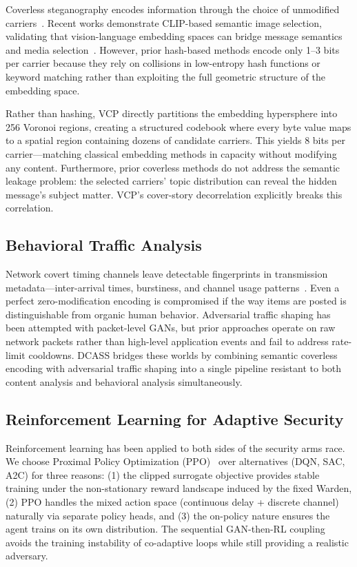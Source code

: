 \documentclass[conference]{IEEEtran}
\begin{document}
Coverless steganography encodes information through the choice of unmodified carriers~\cite{zhou2019coverless}. Recent works demonstrate CLIP-based semantic image selection, validating that vision-language embedding spaces can bridge message semantics and media selection~\cite{radford2021learning}. However, prior hash-based methods encode only 1--3 bits per carrier because they rely on collisions in low-entropy hash functions or keyword matching rather than exploiting the full geometric structure of the embedding space.

Rather than hashing, VCP directly partitions the embedding hypersphere into 256 Voronoi regions, creating a structured codebook where every byte value maps to a spatial region containing dozens of candidate carriers. This yields 8 bits per carrier---matching classical embedding methods in capacity without modifying any content. Furthermore, prior coverless methods do not address the semantic leakage problem: the selected carriers' topic distribution can reveal the hidden message's subject matter. VCP's cover-story decorrelation explicitly breaks this correlation.

\subsection{Behavioral Traffic Analysis}

Network covert timing channels leave detectable fingerprints in transmission metadata---inter-arrival times, burstiness, and channel usage patterns~\cite{cabuk2004ip}. Even a perfect zero-modification encoding is compromised if the way items are posted is distinguishable from organic human behavior. Adversarial traffic shaping has been attempted with packet-level GANs, but prior approaches operate on raw network packets rather than high-level application events and fail to address rate-limit cooldowns. DCASS bridges these worlds by combining semantic coverless encoding with adversarial traffic shaping into a single pipeline resistant to both content analysis and behavioral analysis simultaneously.

\subsection{Reinforcement Learning for Adaptive Security}

Reinforcement learning has been applied to both sides of the security arms race. We choose Proximal Policy Optimization (PPO)~\cite{schulman2017proximal} over alternatives (DQN, SAC, A2C) for three reasons: (1) the clipped surrogate objective provides stable training under the non-stationary reward landscape induced by the fixed Warden, (2) PPO handles the mixed action space (continuous delay + discrete channel) naturally via separate policy heads, and (3) the on-policy nature ensures the agent trains on its own distribution. The sequential GAN-then-RL coupling avoids the training instability of co-adaptive loops while still providing a realistic adversary.
\end{document}
